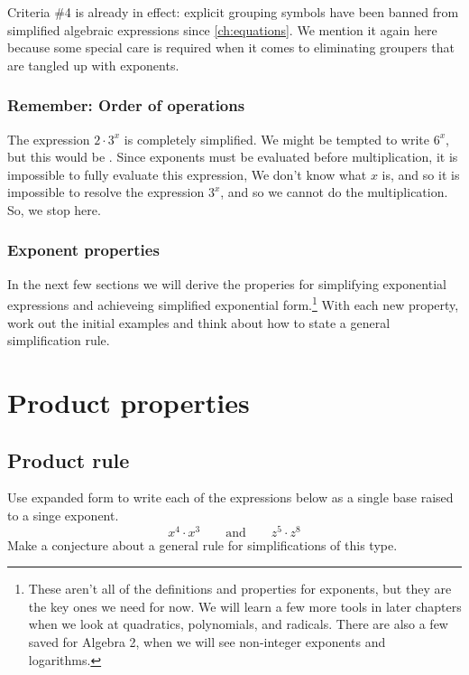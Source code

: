Criteria \#4 is already in effect: explicit grouping symbols have been banned from simplified algebraic expressions since \cref{ch:equations}. We mention it again here because some special care is required when it comes to eliminating groupers that are tangled up with exponents.

\subsubsection{Remember: Order of operations}

The expression $2 \cdot 3^x$ is completely simplified. We might be tempted to write $6^x$, but this would be \evilandwrong. Since exponents must be evaluated before multiplication, it is impossible to fully evaluate this expression, We don't know what $x$ is, and so it is impossible to resolve the expression $3^x$, and so we cannot do the multiplication. So, we stop here.

\subsubsection{Exponent properties}

In the next few sections we will derive the properies for simplifying exponential expressions and achieveing simplified exponential form.\footnote{These aren't all of the definitions and properties for exponents, but they are the key ones we need for now. We will learn a few more tools in later chapters when we look at quadratics, polynomials, and radicals. There are also a few saved for Algebra 2, when we will see non-integer exponents and logarithms.} With each new property, work out the initial examples and think about how to state a general simplification rule.

\section{Product properties}
\label{sec:expoproduct}

\subsection{Product rule}

\begin{boxexplore}[Derivation \#1]
Use expanded form to write each of the expressions below as a single base raised to a singe exponent.
\[x^4 \cdot x^3 \qquad\text{and}\qquad z^5 \cdot z^8\]
Make a conjecture about a general rule for simplifications of this type.
\end{boxexplore}

